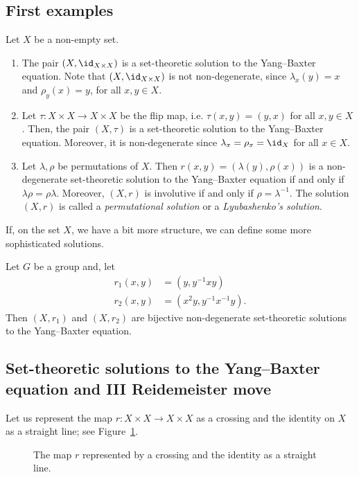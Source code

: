 \subsection{First examples}
    \begin{examples}
        Let $X$ be a non-empty set.  
        \begin{enumerate}
            \item The pair $(X,\id_{X\times X})$ is a  set-theoretic solution to the  Yang--Baxter equation. Note that $(X,\id_{X\times X})$ is not non-degenerate, since $\lambda_x(y)=x$ and $\rho_y(x)=y$, for all $x,y\in X$.
            \item Let $\tau: X \times X \to X \times X$ be the flip map, i.e. $\tau(x,y)=(y,x)$ for all $x,y \in X$. Then, the pair $(X,\tau)$ is a set-theoretic solution to the Yang--Baxter equation. Moreover, it is non-degenerate since $\lambda_x=\rho_x=\id_X$ for all $x\in X$.
            \item Let $\lambda, \rho$ be permutations of $X$. Then $r(x,y)=(\lambda(y),\rho(x))$ is a
            non-degenerate set-theoretic solution to the Yang--Baxter equation if and only if $\lambda\rho = \rho\lambda$.
            Moreover, $(X , r )$ is involutive if and only if $\rho = \lambda^{-1}$. The solution 
            $(X,r)$ is called a \emph{permutational solution} or a \emph{Lyubashenko's solution}.
        \end{enumerate}
    \end{examples}

    If, on the set $X$, we have a bit more structure, we can define some more sophisticated solutions.
    \begin{example}
        Let $G$ be a group and, let
        \begin{align*}
            r_1(x,y) &= (y, y^{-1}xy)\\
            r_2(x,y) &= (x^{2}y, y^{-1}x^{-1}y).
        \end{align*}
        Then $(X,r_1)$ and $(X,r_2)$ are bijective non-degenerate set-theoretic solutions to the Yang--Baxter equation.
    \end{example}

\subsection{Set-theoretic solutions to the Yang--Baxter equation and III Reidemeister move}
    Let us represent the map $r:X \times X \to X \times X$ as a crossing and the identity on $X$ as a straight line; see Figure~\ref{fig:crossing}. 
    \begin{figure}[h!]
        \centering
        \caption{The map $r$ represented by a crossing and the identity as a straight line.}
        \label{fig:crossing}
    \end{figure}

